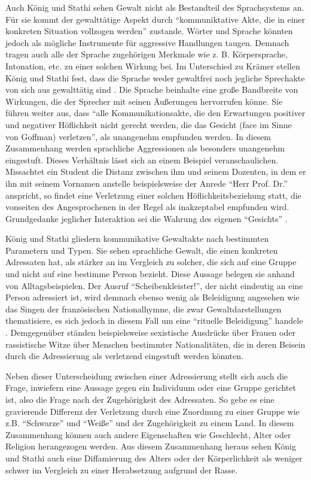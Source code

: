 Auch König und Stathi sehen Gewalt nicht als Bestandteil des Sprachsystems an.
Für sie kommt der gewalttätige Aspekt durch "`kommuniktative Akte, die in einer konkreten Situation vollzogen werden"' \cite[S. 47]{EK10} zustande.
Wörter und Sprache könnten jedoch als mögliche Instrumente für aggressive Handlungen taugen.
Demnach tragen auch alle der Sprache zugehörigen Merkmale wie z. B. Körpersprache, Intonation, etc. zu einer solchen Wirkung bei.
Im Unterschied zu Krämer stellen König und Stathi fest, dass die Sprache weder gewaltfrei noch jegliche Sprechakte von sich aus gewalttätig sind \cite[S. 48]{EK10}.
Die Sprache beinhalte eine große Bandbreite von Wirkungen, die der Sprecher mit seinen Äußerungen hervorrufen könne.
Sie führen weiter aus, dass "`alle Kommunikationsakte, die den Erwartungen positiver und negativer Höflichkeit nicht gerecht werden, die das Gesicht (face im Sinne von Goffman) verletzen"', als unangenehm empfunden werden.
In diesem Zusammenhang werden sprachliche Aggressionen als besonders unangenehm eingestuft.
Dieses Verhältnis lässt sich an einem Beispiel veranschaulichen.
Missachtet ein Student die Distanz zwischen ihm und seinem Dozenten, in dem er ihn mit seinem Vornamen anstelle beispielsweise der Anrede "`Herr Prof. Dr."' anspricht, so findet eine Verletzung einer solchen Höflichkeitsbeziehung statt, die vonseiten des Angesprochenen in der Regel als inakzeptabel empfunden wird.
Grundgedanke jeglicher Interaktion sei die Wahrung des eigenen "`Gesichts"' \cite[S. 50]{EK10}.

König und Stathi gliedern kommunikative Gewaltakte nach bestimmten Parametern und Typen.
Sie sehen sprachliche Gewalt, die einen konkreten Adressaten hat, als stärker an im Vergleich zu solcher, die sich auf eine Gruppe und nicht auf eine bestimme Person bezieht.
Diese Aussage belegen sie anhand von Alltagsbeispielen.
Der Ausruf "`Scheibenkleister!"', der nicht eindeutig an eine Person adressiert ist, wird demnach ebenso wenig als Beleidigung angesehen wie das Singen der französischen Nationalhymne, die zwar Gewaltdarstellungen thematisiere, es sich jedoch in diesem Fall um eine "`rituelle Beleidigung"' handele \cite[S. 51]{EK10}.
Demgegenüber ständen beispielsweise sexistische Ausdrücke über Frauen oder rassistische Witze über Menschen bestimmter Nationalitäten, die in deren Beisein durch die Adressierung als verletzend eingestuft werden könnten.

Neben dieser Unterscheidung zwischen einer Adressierung stellt sich auch die Frage, inwiefern eine Aussage gegen ein Individuum oder eine Gruppe gerichtet ist, also die Frage nach der Zugehörigkeit des Adressaten.
So gebe es eine gravierende Differenz der Verletzung durch eine Zuordnung zu einer Gruppe wie z.B. "`Schwarze"' und "`Weiße"' und der Zugehörigkeit zu einem Land.
In diesem Zusammenhang können auch andere Eigenschaften wie Geschlecht, Alter oder Religion herangezogen werden.
Aus diesem Zusammenhang heraus sehen König und Stathi auch eine Diffamierung des Alters oder der Körperlichkeit als weniger schwer im Vergleich zu einer Herabsetzung aufgrund der Rasse.

